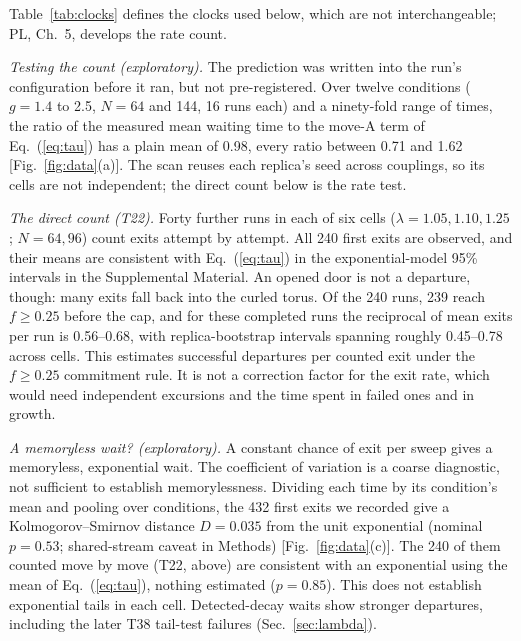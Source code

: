 \documentclass[aps,pre,10pt,twocolumn,superscriptaddress,nofootinbib]{revtex4-2}
\begin{document}
Table~\ref{tab:clocks} defines the clocks used below, which are not interchangeable; PL,
Ch.~5, develops the rate count.

\emph{Testing the count (exploratory).} The prediction was written into the run's configuration
before it ran, but not pre-registered. Over twelve conditions ($g=1.4$ to 2.5, $N=64$ and 144, 16 runs
each) and a ninety-fold range of times, the ratio of the measured mean waiting time to the move-A term
of Eq.~(\ref{eq:tau}) has a plain mean of 0.98, every ratio between 0.71 and 1.62
[Fig.~\ref{fig:data}(a)]. The scan reuses each replica's seed across couplings, so its cells are not
independent; the direct count below is the rate test.

\emph{The direct count (T22).} Forty further runs in each of six cells ($\lambda=1.05,1.10,1.25$;
$N=64,96$) count exits attempt by attempt. All 240 first exits are observed, and their means are
consistent with Eq.~(\ref{eq:tau}) in the exponential-model 95\% intervals in the Supplemental
Material. An opened door is not a departure, though: many exits fall back into the curled torus. Of
the 240 runs, 239 reach $f\ge0.25$ before the cap, and for these completed runs the reciprocal of
mean exits per run is 0.56--0.68, with replica-bootstrap intervals spanning roughly 0.45--0.78 across
cells. This estimates successful departures per counted exit under the $f\ge0.25$ commitment rule. It
is not a correction factor for the exit rate, which would need independent excursions and the time
spent in failed ones and in growth.

\emph{A memoryless wait? (exploratory).} A constant chance of exit per sweep gives a memoryless,
exponential wait. The coefficient of variation is a coarse diagnostic, not sufficient to establish
memorylessness. Dividing each time by its condition's mean and pooling over conditions, the 432
first exits we recorded give a Kolmogorov--Smirnov distance $D=0.035$ from the unit exponential
(nominal $p=0.53$; shared-stream caveat in Methods) [Fig.~\ref{fig:data}(c)]. The 240 of them counted
move by move (T22, above) are consistent with an exponential using the mean of Eq.~(\ref{eq:tau}),
nothing estimated ($p=0.85$). This does not establish exponential tails in each cell.
Detected-decay waits show stronger departures, including the later T38 tail-test failures
(Sec.~\ref{sec:lambda}).
\end{document}
